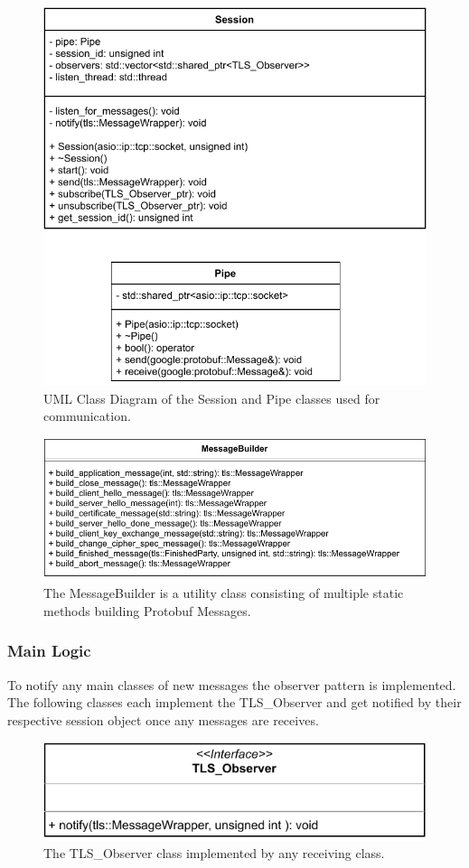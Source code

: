 \documentclass[12pt, letterpaper]{article}
\begin{document}
\begin{figure}[H]
	\centering
	\includegraphics[width=.6\textwidth]{UML/CommunicationClasses}
	\caption{UML Class Diagram of the Session and Pipe classes used for communication.}
	\label{fig:CommunicationClasses}
\end{figure}

\begin{figure}[H]
	\centering
	\includegraphics[width=.7\textwidth]{UML/Messagebuilder}
	\caption{The MessageBuilder is a utility class consisting of multiple static methods building Protobuf Messages.}
	\label{fig:Messagebuilder}
\end{figure}

\subsubsection{Main Logic}
To notify any main classes of new messages the observer pattern is implemented. The following classes each implement the TLS\_Observer and get notified by their respective session object once any messages are receives.

\begin{figure}[H]
	\centering
	\includegraphics[width=.7\textwidth]{UML/Observer}
	\caption{The TLS\_Observer class implemented by any receiving class.}
	\label{fig:Observer}
\end{figure}
\end{document}
